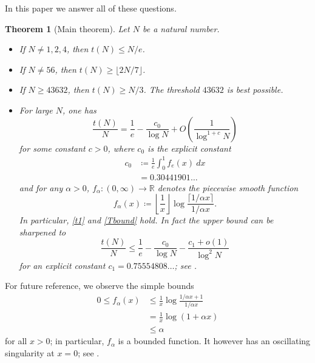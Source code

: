\documentclass[12pt,a4paper,reqno]{amsart}
\numberwithin{equation}{section}
\theoremstyle{plain}
\newtheorem{theorem}{Theorem}[section]
\theoremstyle{definition}
\newcommand\R{\mathbb{R}}
\begin{document}
In this paper we answer all of these questions.

\begin{theorem}[Main theorem]\label{main} Let $N$ be a natural number.
\begin{itemize}
\item[(i)] If $N \neq 1,2,4$, then $t(N) \leq N/e$.
\item[(ii)]  If $N \neq 56$, then $t(N) \geq \lfloor 2N/7 \rfloor$.
\item[(iii)]  If $N \geq 43632$, then $t(N) \geq N/3$.  The threshold $43632$ is best possible.
\item[(iv)]  For large $N$, one has
  \begin{equation}\label{asym}
    \frac{t(N)}{N} = \frac{1}{e} - \frac{c_0}{\log N} + O\left( \frac{1}{\log^{1+c} N} \right)
  \end{equation}
for some constant $c>0$, where $c_0$ is the explicit constant
\begin{equation}\label{c0-def}
  \begin{split}
  c_0 &\coloneqq \frac{1}{e} \int_0^1 f_e(x)\ dx \\
  &= 0.30441901\dots
\end{split}
\end{equation}
and for any $\alpha>0$, $f_\alpha \colon (0,\infty) \to \R$ denotes the piecewise smooth function
\begin{equation}\label{falpha-def} 
  f_\alpha(x) \coloneqq \left\lfloor \frac{1}{x} \right\rfloor \log \frac{\lceil 1/\alpha x \rceil}{1/\alpha x}.
\end{equation}
In particular, \eqref{t1} and \eqref{Tbound} hold.  In fact the upper bound can be sharpened to
\begin{equation}\label{tna} 
  \frac{t(N)}{N} \leq \frac{1}{e} - \frac{c_0}{\log N} - \frac{c_1+o(1)}{\log^2 N} 
\end{equation}
for an explicit constant $c_1=0.75554808\dots$; see .
\end{itemize}
\end{theorem}

For future reference, we observe the simple bounds
\begin{equation}\label{falpha-bound}
 \begin{split}
   0 \leq f_\alpha(x) &\leq \frac{1}{x} \log \frac{1/\alpha x+1}{1/\alpha x}\\
&= \frac{1}{x} \log\left( 1 + \alpha x \right) \\
&\leq \alpha
\end{split}
\end{equation}
for all $x>0$; in particular, $f_\alpha$ is a bounded function.  It however has an oscillating singularity at $x=0$; see .
\end{document}
